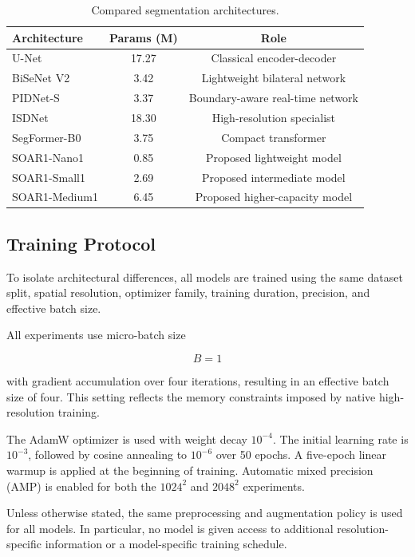 \documentclass[11pt,a4paper]{article}
\begin{document}
\begin{table}[t]
\centering
\caption{Compared segmentation architectures.}
\label{tab:models}
\setlength{\tabcolsep}{6pt}
\renewcommand{\arraystretch}{1.15}
\begin{tabular}{lcc}
\toprule
\textbf{Architecture} & \textbf{Params (M)} & \textbf{Role} \\
\midrule
U-Net & 17.27 & Classical encoder-decoder \\
BiSeNet V2 & 3.42 & Lightweight bilateral network \\
PIDNet-S & 3.37 & Boundary-aware real-time network \\
ISDNet & 18.30 & High-resolution specialist \\
SegFormer-B0 & 3.75 & Compact transformer \\
\midrule
SOAR1-Nano1 & 0.85 & Proposed lightweight model \\
SOAR1-Small1 & 2.69 & Proposed intermediate model \\
SOAR1-Medium1 & 6.45 & Proposed higher-capacity model \\
\bottomrule
\end{tabular}
\end{table}


\subsection{Training Protocol}

To isolate architectural differences, all models are trained using the same 
dataset split, spatial resolution, optimizer family, training duration, 
precision, and effective batch size.

All experiments use micro-batch size

\begin{equation}
B=1
\end{equation}

with gradient accumulation over four iterations, resulting in an effective 
batch size of four. This setting reflects the memory constraints imposed by 
native high-resolution training.

The AdamW optimizer is used with weight decay $10^{-4}$. The initial learning 
rate is $10^{-3}$, followed by cosine annealing to $10^{-6}$ over 50 epochs. 
A five-epoch linear warmup is applied at the beginning of training. 
Automatic mixed precision (AMP) is enabled for both the $1024^2$ and 
$2048^2$ experiments.

Unless otherwise stated, the same preprocessing and augmentation policy is 
used for all models. In particular, no model is given access to additional 
resolution-specific information or a model-specific training schedule.
\end{document}
